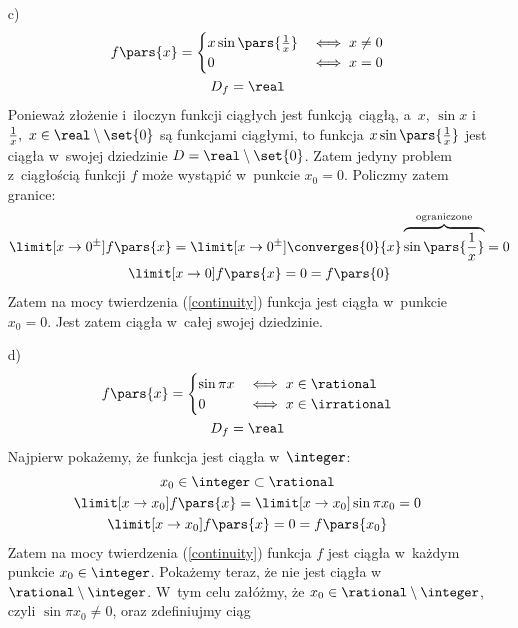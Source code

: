 \begin{itemize}
    \item[c)]
        \begin{gather*}
            f\pars{x} = \begin{cases}
                x\sin\pars{\frac{1}{x}} & \iff x \neq 0\\
                0 & \iff x = 0
            \end{cases}\\
            D_f = \real
        \end{gather*}
        Ponieważ złożenie i~iloczyn funkcji ciągłych jest funkcją ciągłą, a~\(x\), \(\sin x\) i~\(\frac{1}{x},\ x \in \real \setminus \set{0}\) są funkcjami ciągłymi, to funkcja \(x\sin\pars{\frac{1}{x}}\) jest ciągła w~swojej dziedzinie \(D = \real \setminus \set{0}\). Zatem jedyny problem z~ciągłością funkcji \(f\) może wystąpić w~punkcie \(x_0 = 0\). Policzmy zatem granice:
        \begin{gather*}
            \limit[x \to 0^\pm] f\pars{x}
                = \limit[x \to 0^\pm] \converges{0}{x}\overbrace{\sin\pars{\frac{1}{x}}}^{\text{ograniczone}}
                = 0\\
            \limit[x \to 0] f\pars{x} = 0 = f\pars{0}
        \end{gather*}
        Zatem na mocy twierdzenia (\ref{continuity}) funkcja jest ciągła w~punkcie \(x_0 = 0\). Jest zatem ciągła w~całej swojej dziedzinie.
    \item[d)]
        \begin{gather*}
            f\pars{x} = \begin{cases}
                \sin \pi x & \iff x \in \rational\\
                0 & \iff x \in \irrational
            \end{cases}\\
            D_f = \real
        \end{gather*}
        Najpierw pokażemy, że funkcja jest ciągła w~\(\integer\):
        \begin{gather*}
            x_0 \in \integer \subset \rational\\
            \limit[x \to x_0] f\pars{x} = \limit[x \to x_0] \sin \pi x_0 = 0\\
            \limit[x \to x_0] f\pars{x} = 0 = f\pars{x_0}
        \end{gather*}
        Zatem na mocy twierdzenia (\ref{continuity}) funkcja \(f\) jest ciągła w~każdym punkcie \(x_0 \in \integer\). Pokażemy teraz, że nie jest ciągła w~\(\rational \setminus \integer\). W~tym celu załóżmy, że \(x_0 \in \rational \setminus \integer\), czyli \(\sin \pi x_0 \neq 0\), oraz zdefiniujmy ciąg

\end{itemize}
